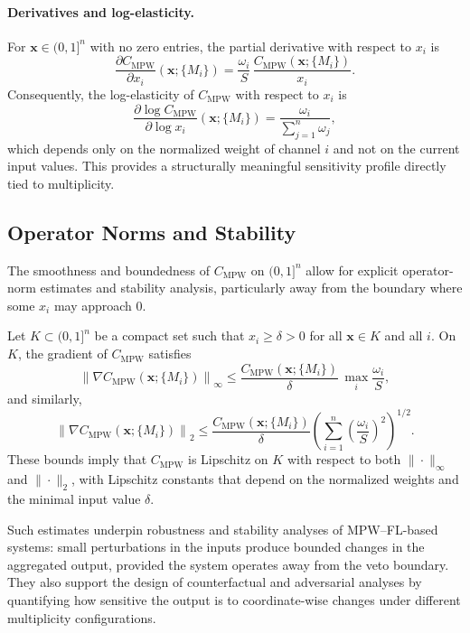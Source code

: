 \documentclass[11pt]{article}
\begin{document}
\paragraph{Derivatives and log-elasticity.}
For $\mathbf{x} \in (0,1]^n$ with no zero entries, the partial derivative with respect to $x_i$ is
\[
  \frac{\partial C_{\mathrm{MPW}}}{\partial x_i}(\mathbf{x};\{M_i\})
  = \frac{\omega_i}{S}\,\frac{C_{\mathrm{MPW}}(\mathbf{x};\{M_i\})}{x_i}.
\]
Consequently, the log-elasticity of $C_{\mathrm{MPW}}$ with respect to $x_i$ is
\[
  \frac{\partial \log C_{\mathrm{MPW}}}{\partial \log x_i}(\mathbf{x};\{M_i\})
  = \frac{\omega_i}{\sum_{j=1}^n \omega_j},
\]
which depends only on the normalized weight of channel $i$ and not on the current input values. This provides a structurally meaningful sensitivity profile directly tied to multiplicity.

\subsection{Operator Norms and Stability}
\label{subsec:norms-stability}

The smoothness and boundedness of $C_{\mathrm{MPW}}$ on $(0,1]^n$ allow for explicit operator-norm estimates and stability analysis, particularly away from the boundary where some $x_i$ may approach $0$.

Let $K \subset (0,1]^n$ be a compact set such that $x_i \ge \delta > 0$ for all $\mathbf{x} \in K$ and all $i$. On $K$, the gradient of $C_{\mathrm{MPW}}$ satisfies
\[
  \left\|\nabla C_{\mathrm{MPW}}(\mathbf{x};\{M_i\})\right\|_\infty
  \le \frac{C_{\mathrm{MPW}}(\mathbf{x};\{M_i\})}{\delta}\,\max_i \frac{\omega_i}{S},
\]
and similarly,
\[
  \left\|\nabla C_{\mathrm{MPW}}(\mathbf{x};\{M_i\})\right\|_2
  \le \frac{C_{\mathrm{MPW}}(\mathbf{x};\{M_i\})}{\delta}
      \left(\sum_{i=1}^n \left(\frac{\omega_i}{S}\right)^2\right)^{1/2}.
\]
These bounds imply that $C_{\mathrm{MPW}}$ is Lipschitz on $K$ with respect to both $\|\cdot\|_\infty$ and $\|\cdot\|_2$, with Lipschitz constants that depend on the normalized weights and the minimal input value $\delta$.

Such estimates underpin robustness and stability analyses of MPW--FL-based systems: small perturbations in the inputs produce bounded changes in the aggregated output, provided the system operates away from the veto boundary. They also support the design of counterfactual and adversarial analyses by quantifying how sensitive the output is to coordinate-wise changes under different multiplicity configurations.
\end{document}
